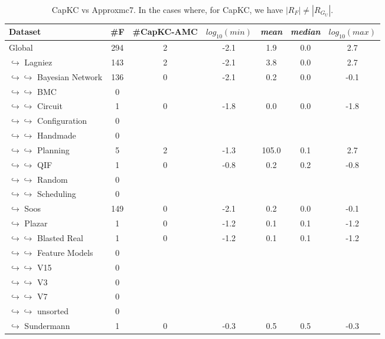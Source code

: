 \documentclass{article}
\newcommand\capkc[0]{CapKC\xspace}
\newcommand\capkcamc[0]{CapKC-AMC\xspace}
\begin{document}
    
\begin{table}[h!]
        \centering
            \begin{tabular}{l|c|c|c|c|c|c}
                Dataset & \#F & \#\capkcamc & $\textit{log}_{10}(\textit{min})$ & \textit{mean} & \textit{median} & $\textit{log}_{10}(\textit{max})$ \\
                \hline 
Global & 294 & 2 &  -2.1 &   1.9 &   0.0 &   2.7 \\
$\hookrightarrow$ Lagniez \cite{D4} & 143 & 2 &  -2.1 &   3.8 &   0.0 &   2.7 \\
$\hookrightarrow \hookrightarrow$ Bayesian Network & 136 & 0 &  -2.1 &   0.2 &   0.0 &  -0.1 \\
$\hookrightarrow \hookrightarrow$ BMC & 0 & & & \\
$\hookrightarrow \hookrightarrow$ Circuit & 1 & 0 &  -1.8 &   0.0 &   0.0 &  -1.8 \\
$\hookrightarrow \hookrightarrow$ Configuration & 0 & & & \\
$\hookrightarrow \hookrightarrow$ Handmade & 0 & & & \\
$\hookrightarrow \hookrightarrow$ Planning & 5 & 2 &  -1.3 & 105.0 &   0.1 &   2.7 \\
$\hookrightarrow \hookrightarrow$ QIF & 1 & 0 &  -0.8 &   0.2 &   0.2 &  -0.8 \\
$\hookrightarrow \hookrightarrow$ Random & 0 & & & \\
$\hookrightarrow \hookrightarrow$ Scheduling & 0 & & & \\
$\hookrightarrow$ Soos \cite{soos_2024_10449477} & 149 & 0 &  -2.1 &   0.2 &   0.0 &  -0.1 \\
$\hookrightarrow$ Plazar \cite{Plazar2019} & 1 & 0 &  -1.2 &   0.1 &   0.1 &  -1.2 \\
$\hookrightarrow \hookrightarrow$ Blasted Real & 1 & 0 &  -1.2 &   0.1 &   0.1 &  -1.2 \\
$\hookrightarrow \hookrightarrow$ Feature Models & 0 & & & \\
$\hookrightarrow \hookrightarrow$ V15 & 0 & & & \\
$\hookrightarrow \hookrightarrow$ V3 & 0 & & & \\
$\hookrightarrow \hookrightarrow$ V7 & 0 & & & \\
$\hookrightarrow \hookrightarrow$ unsorted & 0 & & & \\
$\hookrightarrow$ Sundermann \cite{SBK+:SPLC24} & 1 & 0 &  -0.3 &   0.5 &   0.5 &  -0.3 \\
            \end{tabular}
                \caption{\capkc vs Approxmc7. In the cases where, for \capkc, we have $|R_F| \neq |R_{G_U}|$.
        }
    \end{table}

    

    
\end{document}
